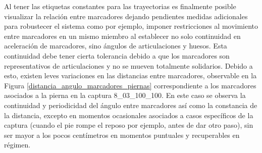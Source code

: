 Al tener las etiquetas constantes para las trayectorias es finalmente posible visualizar la relación entre marcadores dejando pendientes medidas adicionales para robustecer el sistema como por ejemplo, imponer restricciones al movimiento entre marcadores en un mismo miembro al establecer no solo continuidad en aceleración de marcadores, sino ángulos de articulaciones y huesos. Esta continuidad debe tener cierta tolerancia debido a que los marcadores son representativos de articulaciones y no se mueven totalmente solidarios. Debido a esto, existen leves variaciones en las distancias entre marcadores, observable en la Figura \ref{distancia_angulo_marcadores_piernas} correspondiente a los marcadores asociados a la pierna en la captura 8\_03\_100\_100. En este caso se observa la continuidad y periodicidad del ángulo entre marcadores así como la constancia de la distancia, excepto en momentos ocasionales asociados a casos específicos de la captura (cuando el pie rompe el reposo por ejemplo, antes de dar otro paso), sin ser mayor a los pocos centímetros en momentos puntuales y recuperables en régimen.

